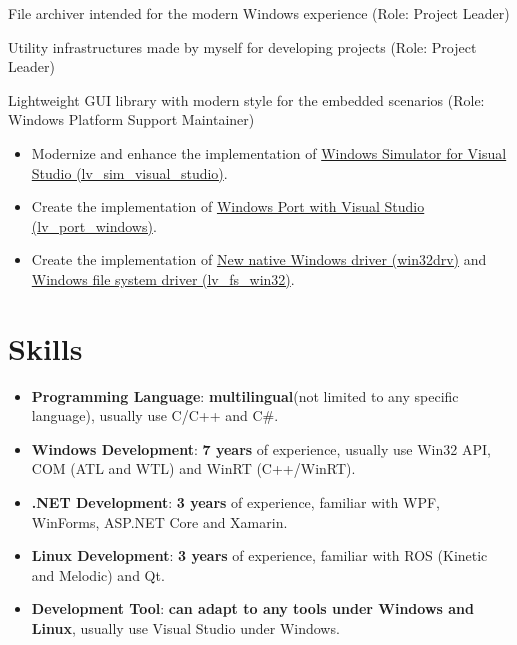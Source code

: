 \documentclass{resume}
\begin{document}
File archiver intended for the modern Windows experience (Role: Project Leader)

Utility infrastructures made by myself for developing projects (Role: Project Leader)

Lightweight GUI library with modern style for the embedded scenarios (Role: Windows Platform Support Maintainer)
\begin{itemize}
  \item Modernize and enhance the implementation of \href{https://github.com/lvgl/lv_sim_visual_studio}{Windows Simulator for Visual Studio (lv\_sim\_visual\_studio)}.
  \item Create the implementation of \href{https://github.com/lvgl/lv_port_windows}{Windows Port with Visual Studio (lv\_port\_windows)}.
  \item Create the implementation of \href{https://github.com/lvgl/lv_drivers/pull/117}{New native Windows driver (win32drv)} and \href{https://github.com/lvgl/lvgl/pull/2701}{Windows file system driver (lv\_fs\_win32)}.
\end{itemize}

\section{Skills}
\begin{itemize}

  \item \textbf{Programming Language}:
    \textbf{multilingual}(not limited to any specific language), usually use C/C++ and C\#.

  \item \textbf{Windows Development}:
    \textbf{7 years} of experience, usually use Win32 API, COM (ATL and WTL) and WinRT (C++/WinRT).

  \item \textbf{.NET Development}:
    \textbf{3 years} of experience, familiar with WPF, WinForms, ASP.NET Core and Xamarin.
  
  \item \textbf{Linux Development}:
    \textbf{3 years} of experience, familiar with ROS (Kinetic and Melodic) and Qt.

  \item \textbf{Development Tool}:
    \textbf{can adapt to any tools under Windows and Linux}, usually use Visual Studio under Windows.

\end{itemize}
\end{document}
